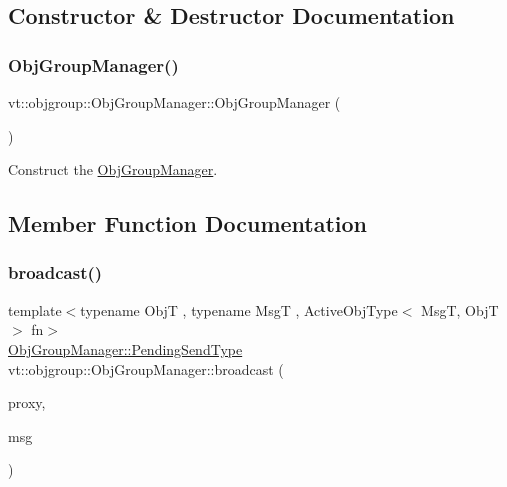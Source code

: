 \subsection{Constructor \& Destructor Documentation}
\mbox{\label{structvt_1_1objgroup_1_1_obj_group_manager_a2de45aef25bff09a2fafabe227aa0ee7}} 
\subsubsection{\texorpdfstring{Obj\+Group\+Manager()}{ObjGroupManager()}}
{\footnotesize\ttfamily vt\+::objgroup\+::\+Obj\+Group\+Manager\+::\+Obj\+Group\+Manager (\begin{DoxyParamCaption}{ }\end{DoxyParamCaption})\hspace{0.3cm}{\ttfamily [default]}}



Construct the \hyperlink{structvt_1_1objgroup_1_1_obj_group_manager}{Obj\+Group\+Manager}. 



\subsection{Member Function Documentation}
\mbox{\label{structvt_1_1objgroup_1_1_obj_group_manager_aada9378cc1fd44caff3c4dcb79aaf582}} 
\subsubsection{\texorpdfstring{broadcast()}{broadcast()}\hspace{0.1cm}{\footnotesize\ttfamily [1/2]}}
{\footnotesize\ttfamily template$<$typename ObjT , typename MsgT , Active\+Obj\+Type$<$ Msg\+T, Obj\+T $>$ fn$>$ \\
\hyperlink{structvt_1_1objgroup_1_1_obj_group_manager_a4f82f640edf670ba5a282074e5710921}{Obj\+Group\+Manager\+::\+Pending\+Send\+Type} vt\+::objgroup\+::\+Obj\+Group\+Manager\+::broadcast (\begin{DoxyParamCaption}\item[{\hyperlink{structvt_1_1objgroup_1_1_obj_group_manager_aea65eef52f240a52210132eef5ce591f}{Proxy\+Type}$<$ ObjT $>$}]{proxy,  }\item[{\hyperlink{namespacevt_ab2b3d506ec8e8d1540aede826d84a239}{Msg\+Shared\+Ptr}$<$ MsgT $>$}]{msg }\end{DoxyParamCaption})}



